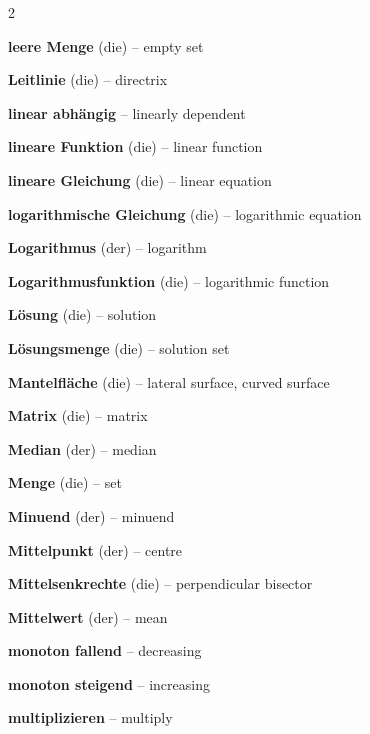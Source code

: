 \begin{multicols}{2}
\par\nopagebreak
\textbf{leere Menge} (die) -- empty set\dotfill\hyperref[e:104]{\pageref*{e:104}}\par
\textbf{Leitlinie} (die) -- directrix\dotfill\hyperref[e:318]{\pageref*{e:318}}\par
\textbf{linear abhängig} -- linearly dependent\dotfill\hyperref[e:319]{\pageref*{e:319}}\par
\textbf{lineare Funktion} (die) -- linear function\dotfill\hyperref[e:119]{\pageref*{e:119}}\par
\textbf{lineare Gleichung} (die) -- linear equation\dotfill\hyperref[e:81]{\pageref*{e:81}}\par
\textbf{logarithmische Gleichung} (die) -- logarithmic equation\dotfill\hyperref[e:85]{\pageref*{e:85}}\par
\textbf{Logarithmus} (der) -- logarithm\dotfill\hyperref[e:95]{\pageref*{e:95}}\par
\textbf{Logarithmusfunktion} (die) -- logarithmic function\dotfill\hyperref[e:131]{\pageref*{e:131}}\par
\textbf{Lösung} (die) -- solution\dotfill\hyperref[e:78]{\pageref*{e:78}}\par
\textbf{Lösungsmenge} (die) -- solution set\dotfill\hyperref[e:79]{\pageref*{e:79}}\par

\par\nopagebreak
\textbf{Mantelfläche} (die) -- lateral surface, curved surface\dotfill\hyperref[e:250]{\pageref*{e:250}}\par
\textbf{Matrix} (die) -- matrix\dotfill\hyperref[e:320]{\pageref*{e:320}}\par
\textbf{Median} (der) -- median\dotfill\hyperref[e:339]{\pageref*{e:339}}\par
\textbf{Menge} (die) -- set\dotfill\hyperref[e:96]{\pageref*{e:96}}\par
\textbf{Minuend} (der) -- minuend\dotfill\hyperref[e:19]{\pageref*{e:19}}\par
\textbf{Mittelpunkt} (der) -- centre\dotfill\hyperref[e:212]{\pageref*{e:212}}\par
\textbf{Mittelsenkrechte} (die) -- perpendicular bisector\dotfill\hyperref[e:170]{\pageref*{e:170}}\par
\textbf{Mittelwert} (der) -- mean\dotfill\hyperref[e:338]{\pageref*{e:338}}\par
\textbf{monoton fallend} -- decreasing\dotfill\hyperref[e:143]{\pageref*{e:143}}\par
\textbf{monoton steigend} -- increasing\dotfill\hyperref[e:142]{\pageref*{e:142}}\par
\textbf{multiplizieren} -- multiply\dotfill\hyperref[e:21]{\pageref*{e:21}}\par


\end{multicols}
